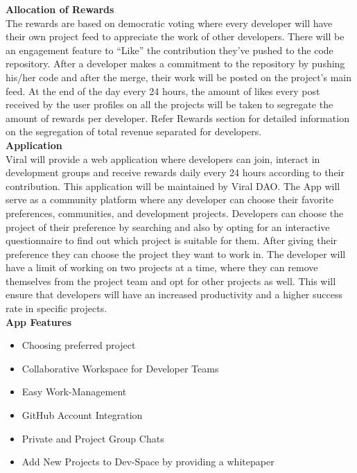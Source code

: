 \documentclass[10pt]{article}
\begin{document}
\textbf{Allocation of Rewards}\\

The rewards are based on democratic voting where every developer will have their own project feed to appreciate the work of other developers. There will be an engagement feature to “Like” the contribution they’ve pushed to the code repository. After a developer makes a commitment to the repository by pushing his/her code and after the merge, their work will be posted on the project’s main feed. At the end of the day every 24 hours, the amount of likes every post received by the user profiles on all the projects will be taken to segregate the amount of rewards per developer. Refer Rewards section for detailed information on the segregation of total revenue separated for developers.\\

\textbf{Application}\\

Viral will provide a web application where developers can join, interact in development groups and receive rewards daily every 24 hours according to their contribution. This application will be maintained by Viral DAO. The App will serve as a community platform where any developer can choose their favorite preferences, communities, and development projects. Developers can choose the project of their preference by searching and also by opting for an interactive questionnaire to find out which project is suitable for them. After giving their preference they can choose the project they want to work in. The developer will have a limit of working on two projects at a time, where they can remove themselves from the project team and opt for other projects as well. This will ensure that developers will have an increased productivity and a higher success rate in specific projects.\\

\textbf{App Features}\\

\begin{itemize}[leftmargin=+0.2in]
\item Choosing preferred project
\item Collaborative Workspace for Developer Teams
\item Easy Work-Management
\item GitHub Account Integration
\item Private and Project Group Chats
\item Add New Projects to Dev-Space by providing a whitepaper
\end{itemize}
\end{document}
